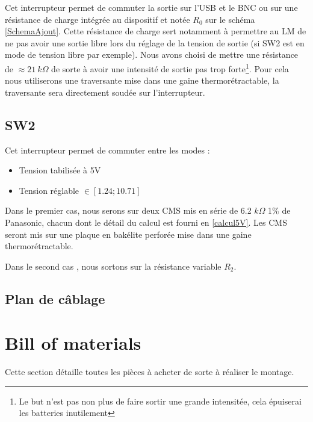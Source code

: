 \documentclass[12pt]{article}
\begin{document}
Cet interrupteur permet de commuter la sortie sur l'USB et le BNC ou sur une résistance de charge intégrée au dispositif
et notée $R_0$ sur le schéma \ref{SchemaAjout}. Cette résistance de charge sert notamment à permettre au LM de ne pas avoir
une sortie libre lors du réglage de la tension de sortie (si SW2 est en mode de tension libre par exemple). Nous avons 
choisi de mettre une résistance de $\approx 21\ k\Omega$ de sorte à avoir une intensité de sortie pas trop forte\footnote{
Le but n'est pas non plus de faire sortir une grande intensitée, cela épuiserai les batteries inutilement}. Pour
cela nous utiliserons une traversante mise dans une gaine thermorétractable, la traversante sera directement soudée 
sur l'interrupteur.

\subsection{SW2}

Cet interrupteur permet de commuter entre les modes :

\begin{itemize}
	\item Tension tabilisée à 5V
	\item Tension réglable $\in [1.24 ; 10.71]$\\
\end{itemize}

Dans le premier cas, nous serons sur deux CMS mis en série de 6.2 $k\Omega$ 1\% de Panasonic, chacun dont 
le détail du calcul est fourni en \ref{calcul5V}. Les CMS seront mis sur une plaque en bakélite perforée mise dans
une gaine thermorétractable.\newline

Dans le second cas , nous sortons sur la résistance variable $R_2$.

\subsection{Plan de câblage}




\newpage
\section{Bill of materials}
Cette section détaille toutes les pièces à acheter de sorte à réaliser le montage.
\end{document}
